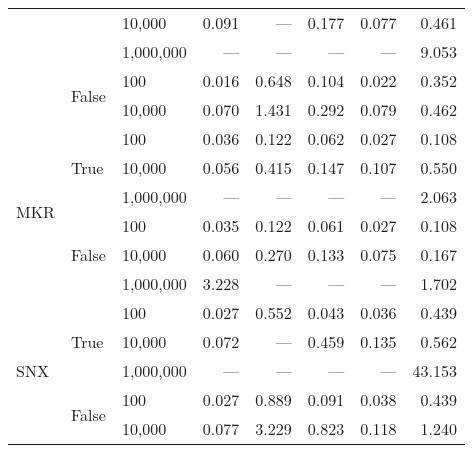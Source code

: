 \begin{tabular}{lllrrrrr}
                          &                        & 10,000          & 0.091   & ---    & 0.177 & 0.077 & 0.461   \\
                          &                        & 1,000,000       & ---     & ---    & ---   & ---   & 9.053   \\
    \cline{2-8}
                          & \multirow{2}{*}{False} & 100             & 0.016   & 0.648  & 0.104 & 0.022 & 0.352   \\
                          &                        & 10,000          & 0.070   & 1.431  & 0.292 & 0.079 & 0.462   \\
    \cline{1-8}
    \cline{2-8}
    \multirow{6}{*}{MKR}  & \multirow{3}{*}{True}  & 100             & 0.036   & 0.122  & 0.062 & 0.027 & 0.108   \\
                          &                        & 10,000          & 0.056   & 0.415  & 0.147 & 0.107 & 0.550   \\
                          &                        & 1,000,000       & ---     & ---    & ---   & ---   & 2.063   \\
    \cline{2-8}
                          & \multirow{3}{*}{False} & 100             & 0.035   & 0.122  & 0.061 & 0.027 & 0.108   \\
                          &                        & 10,000          & 0.060   & 0.270  & 0.133 & 0.075 & 0.167   \\
                          &                        & 1,000,000       & 3.228   & ---    & ---   & ---   & 1.702   \\
    \cline{1-8}
    \cline{2-8}
    \multirow{5}{*}{SNX}  & \multirow{3}{*}{True}  & 100             & 0.027   & 0.552  & 0.043 & 0.036 & 0.439   \\
                          &                        & 10,000          & 0.072   & ---    & 0.459 & 0.135 & 0.562   \\
                          &                        & 1,000,000       & ---     & ---    & ---   & ---   & 43.153  \\
    \cline{2-8}
                          & \multirow{2}{*}{False} & 100             & 0.027   & 0.889  & 0.091 & 0.038 & 0.439   \\
                          &                        & 10,000          & 0.077   & 3.229  & 0.823 & 0.118 & 1.240   \\
    \bottomrule
\end{tabular}

